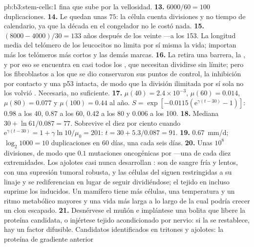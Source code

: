 \begin{solution}{pb:b3:stem-cells:1}
fina que sube por la vellosidad.
\textbf{13.} $6000/60 = 100$ duplicaciones.
\textbf{14.} Le quedan unas $75$: la célula cuenta divisiones y no
tiempo de calendario, ya que la década en el congelador no le costó
nada.
\textbf{15.} $(8000 - 4000)/30 = 133$ años después de los veinte ---a
los 153. La longitud media del telómero de los leucocitos no limita por
sí misma la vida; importan más los telómeros más cortos y las demás
marcas.
\textbf{16.} La  retira una barrera, la , y por eso se encuentra en casi todos los , que
necesitan dividirse sin límite; pero los fibroblastos a los que se dio
 conservaron sus puntos de control, la inhibición por
contacto y una p53 intacta, de modo que la división ilimitada por sí
sola no los volvió . Necesaria, no suficiente.
\textbf{17.} $\mu(40) = 2.4\times 10^{-3}$, $\mu(60) = 0.014$, $\mu(80) =
0.077$ y $\mu(100) = 0.44$ al año. $S = \exp[-0.0115(\mathrm{e}^{\gamma
(t-30)} - 1)]$: $0.98$ a los 40, $0.87$ a los 60, $0.42$ a los 80 y
$0.006$ a los 100.
\textbf{18.} Mediana $30 + \ln 61/0.087 = 77$. Sobrevive el diez por
ciento cuando $\mathrm{e}^{\gamma(t-30)} = 1 + \gamma\ln 10/\mu_{0} = 201$: $t = 30 +
5.3/0.087 = 91$.
\textbf{19.} \qty{0.67}{mm/d}; $\log_{2}1000 = 10$ duplicaciones en 60
días, una cada seis días.
\textbf{20.} Unas $10^{8}$ divisiones, de modo que $0.1$ mutaciones
oncogénicas por  ---una de cada diez extremidades. Los
ajolotes casi nunca desarrollan : son de sangre fría y lentos,
con una supresión tumoral robusta, y las células del  siguen
restringidas a su linaje y se rediferencian en lugar de seguir
dividiéndose; el tejido en  incluso suprime los 
inducidos. Un mamífero tiene más células, una temperatura y un ritmo
metabólico mayores y una vida más larga a lo largo de la cual podría
crecer un clon escapado.
\textbf{21.} Desnérvese el muñón e implántese una bolita que libere la
proteína candidata, o injértese tejido acondicionado por nervio: si la
 se restablece, hay un factor difusible. Candidatos
identificados en tritones y ajolotes: la proteína de gradiente anterior

\end{solution}
